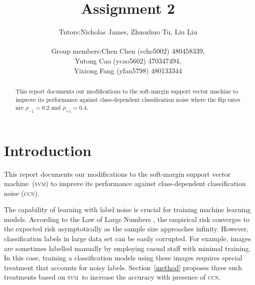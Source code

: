 \documentclass[12pt]{article} %
\title{Assignment 2}
\newcommand{\svm}{\textsc{svm}}
\newcommand{\rhoo}{\rho_{+1}}
\newcommand{\rhoz}{\rho_{-1}}
\begin{document}
\author{%
 \begin{tabular}{rl}
  Tutors:& Nicholas James, Zhuozhuo Tu, Liu Liu\\ \\
Group members: & Chen Chen (cche5002) 480458339,\\
& Yutong Cao (ycao5602) 470347494,\\
& Yixiong Fang (yfan5798) 480133344
\end{tabular}
}

\maketitle



\begin{abstract}
This report documents our modifications to the soft-margin support vector machine to improve its performance against class-dependent classification noise where the flip rates are $\rhoz=0.2$ and $\rhoo=0.4$.
\end{abstract}
\tableofcontents
\section{Introduction}
This report documents our modifications to the soft-margin support vector machine~(\svm) to improve its performance against class-dependent classification noise (\textsc{ccn}).

The capability of learning with label noise is crucial for training machine learning models. According to the Law of Large Numbers \citep{hardle2007applied}, the empirical risk converges to the expected risk asymptotically as the sample size approaches infinity. However, classification labels in large data set can be easily corrupted. For example, images  are sometimes labelled manually by employing casual staff with minimal training. In this case, training a classification models using these images requires special treatment that accounts for noisy labels. Section~\ref{method} proposes three such treatments based on \svm\ to increase the accuracy with presence of \textsc{ccn}.

\end{document}
